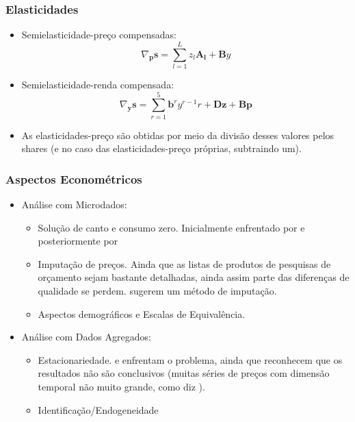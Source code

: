 \documentclass{beamer}
\begin{document}
\begin{frame}[fragile]\frametitle{Elasticidades}
\begin{itemize}
  \item Semielasticidade-preço compensadas:
  \[
  \nabla_{\mathbf{p}}\mathbf{s}=\sum_{l=1}^{L}z_{l}\mathbf{A_{l}} + \mathbf{B}y
  \]
  \item Semielasticidade-renda compensada:
  \[
  \nabla_{\mathbf{y}}\mathbf{s}=\sum_{r=1}^{5} \mathbf{b}^{r} y^{r-1} r + \mathbf{Dz} + \mathbf{Bp}
  \]
  \item As elasticidades-preço são obtidas por meio da divisão desses valores pelos shares (e no caso das elasticidades-preço próprias, subtraindo um).
\end{itemize}
    


\end{frame}

\begin{frame}[fragile]\frametitle{Aspectos Econométricos}
\label{Econometrics}
\begin{itemize}
	\item Análise com Microdados:
	\begin{itemize}
		\item Solução de canto e consumo zero. Inicialmente enfrentado por \citet{Heien1990} e posteriormente por \citet{Shonkwiler1999} 
		\item Imputação de preços. Ainda que as listas de produtos de pesquisas de orçamento sejam bastante detalhadas, ainda assim parte das diferenças de qualidade se perdem. \citet{Cox1986} sugerem um método de imputação.
		\item Aspectos demográficos e Escalas de Equivalência. \hyperlink{Equiv_Sc}{}

	\end{itemize}
	\item Análise com Dados Agregados:
	\begin{itemize}
		\item Estacionariedade. \citet{Ng1995} e \citet{Lewbel1996} enfrentam o problema, ainda que reconhecem que os resultados não são conclusivos (muitas séries de preços com dimensão temporal não muito grande, como diz \citet{Lewbel1997}).
		\item Identificação/Endogeneidade
	\end{itemize}
\end{itemize}
    


\end{frame}
\end{document}
